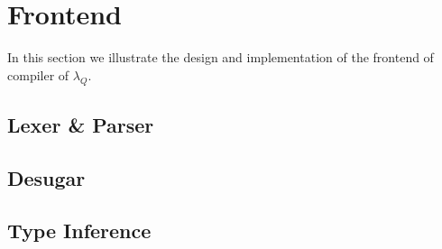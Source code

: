 \section{Frontend}
In this section we illustrate the design and implementation of the frontend of compiler of $\lambda_Q$.

\subsection{Lexer \& Parser}

\subsection{Desugar}

\subsection{Type Inference}

\subsection{}